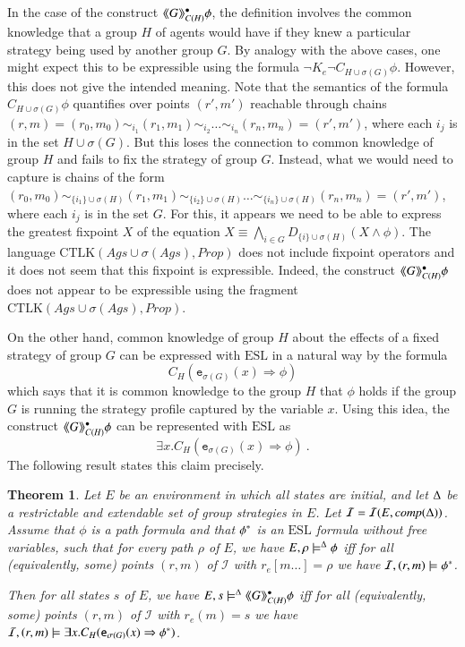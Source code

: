 \documentclass[a4wide]{article}
\newcommand{\CTLK}{\mbox{CTLK}}
\newcommand{\ESL}{\mbox{ESL}}
\newcommand{\Prop}{Prop}
\newtheorem{theorem}{Theorem}
\theoremstyle{examplesty}
\newcommand{\strat}{\sigma}
\newcommand{\Ags}{\mathit{Ags}}
\newcommand{\I}{\mathcal{I}}
\newcommand{\atlop}[1]{\langle\hspace{-2pt}\langle #1 \rangle \hspace{-2pt}\rangle }
\newcommand{\existsg}[1]{\exists #1.}
\newcommand{\lid}[2]{\mathtt{e}_{#1}(#2)}
\newcommand{\rimp}{\Rightarrow}
\newcommand{\Env}{E}
\begin{document}
In the case of the construct $\atlop{G}^\bullet_{C(H)}\phi$, the definition involves the 
common knowledge that a group $H$ of agents would have if they knew a particular strategy being used by another group $G$. 
By analogy with the above cases, one might expect this to be expressible using the formula 
 $\neg K_e \neg C_{H \cup \strat(G)} \phi$. However, this does not give the intended meaning.
Note that the semantics of the formula $C_{H \cup \strat(G)} \phi$  quantifies over points $(r',m')$ 
reachable through chains $(r,m)=(r_0,m_0) \sim_{i_1} (r_1,m_1)  \sim_{i_2} \ldots \sim_{i_n} (r_n,m_n)=(r',m')$, 
where each $i_j$ is in the set $H\cup \strat(G)$. But this loses the connection to common knowledge of group $H$
and fails to fix the strategy of group $G$. Instead, what we would need to capture is chains of the form 
$(r_0,m_0) \sim_{\{i_1\}\cup \strat(H)} (r_1,m_1)  \sim_{\{i_2\}\cup \strat(H)}  \ldots \sim_{\{i_n\}\cup \strat(H)}  (r_n,m_n)=(r',m')$, 
where each $i_j$ is in the set $G$.  
For this, it appears we need to be able to express the greatest fixpoint $X$ of the equation $ X \equiv \bigwedge_{i\in G} D_{\{i\}\cup \strat(H)} (X \land \phi)$. 
The language 
$\CTLK(\Ags\cup\strat(\Ags),\Prop)$ 
does not include fixpoint operators and it does not seem that  this fixpoint is expressible. 
Indeed, the construct $\atlop{G}^\bullet_{C(H)}\phi$  does not appear to be 
expressible using the fragment 
$\CTLK(\Ags \cup\strat(\Ags),\Prop)$. 

On the other hand, common knowledge of group $H$ about the effects of a fixed strategy of group $G$ 
can be expressed with $\ESL$ in a natural way by the formula  
$$C_{H}(\lid{\strat(G)}{x} \rimp \phi)$$
which says that it is common knowledge to the group 
$H$ that $\phi$ holds if the group $G$ 
is running the strategy profile 
captured 
by the variable $x$. 
Using this idea, the 
 construct 
$\atlop{G}^\bullet_{C(H)}\phi$ 
 can be represented with $\ESL$  as 
$$ \existsg{x}  C_{H}(\lid{\strat(G)}{x} \rimp \phi)~.$$
The following  result states this claim precisely. 



\begin{theorem} \label{thm:atel}
Let $\Env$ be an environment  in which all states are initial,
and let $\Delta$ be a restrictable and extendable set of group strategies in $E$. 
Let $\I = \I(\Env,\compl{\GStrats})$. 
Assume that $\phi$ 
is a path formula
and that $\phi^*$ is an $\ESL$ formula
without free variables,  
such that  for every path $\rho$ of $\Env$, 
we have  $\Env, \rho \models^\GStrats \phi$ iff for all (equivalently, some)  points $(r,m)$ of  
$\I$ with $r_e[m\ldots] = \rho$ we have $\I, (r,m)\models \trl{\phi}$.  

Then for all states $s$ of $\Env$, 
we have  $\Env, s \models^\GStrats \atlop{G}^\bullet_{C(H)}\phi$ iff for all (equivalently, some)  points $(r,m)$ of  
$\I$ with $r_e(m) = s$ we have $\I, (r,m)\models \existsg{x}  C_{H}(\lid{\strat(G)}{x} \rimp \trl{\phi})$.  
\end{theorem} 
\end{document}
